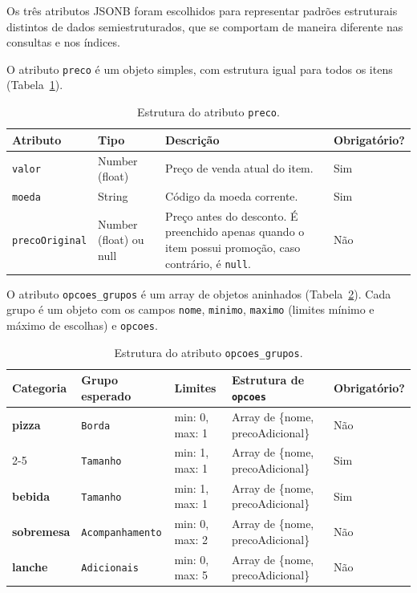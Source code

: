 Os três atributos JSONB foram escolhidos para representar padrões estruturais distintos de dados semiestruturados, 
que se comportam de maneira diferente nas consultas e nos índices.

O atributo \texttt{preco} é um objeto simples, com estrutura igual para todos os itens (Tabela~\ref{tab:jsonb-preco}). 

\begin{table}[H]
\centering
\renewcommand{\arraystretch}{1.1}
\caption{Estrutura do atributo \texttt{preco}.}
\label{tab:jsonb-preco}
\small
\begin{tabular}{|l|l|p{6cm}|l|}
\hline
\textbf{Atributo} & \textbf{Tipo} & \textbf{Descrição} & \textbf{Obrigatório?} \\ \hline
\texttt{valor} & Number (float) & Preço de venda atual do item. & Sim \\ \hline
\texttt{moeda} & String & Código da moeda corrente. & Sim \\ \hline
\texttt{precoOriginal} & Number (float) ou null & Preço antes do desconto. É preenchido apenas quando o item possui promoção, caso contrário, é \texttt{null}. & Não \\ \hline
\end{tabular}
\vspace{0.4em}
\end{table}

O atributo \texttt{opcoes\_grupos} é um array de objetos aninhados (Tabela~\ref{tab:jsonb-opcoes}). Cada grupo é um
objeto com os campos \texttt{nome}, \texttt{minimo}, \texttt{maximo} (limites mínimo e máximo de escolhas) e
\texttt{opcoes}. 

\begin{table}[H]
\centering
\renewcommand{\arraystretch}{1.1}
\caption{Estrutura do atributo \texttt{opcoes\_grupos}.}
\label{tab:jsonb-opcoes}
\small
\begin{tabular}{|l|l|l|p{4.2cm}|l|}
\hline
\textbf{Categoria} & \textbf{Grupo esperado} & \textbf{Limites} & \textbf{Estrutura de \texttt{opcoes}} & \textbf{Obrigatório?} \\ \hline
\textbf{pizza} & \texttt{Borda} & min: 0, max: 1 & Array de \{nome, precoAdicional\} & Não \\ \cline{2-5}
 & \texttt{Tamanho} & min: 1, max: 1 & Array de \{nome, precoAdicional\} & Sim \\ \hline
\textbf{bebida} & \texttt{Tamanho} & min: 1, max: 1 & Array de \{nome, precoAdicional\} & Sim \\ \hline
\textbf{sobremesa} & \texttt{Acompanhamento} & min: 0, max: 2 & Array de \{nome, precoAdicional\} & Não \\ \hline
\textbf{lanche} & \texttt{Adicionais} & min: 0, max: 5 & Array de \{nome, precoAdicional\} & Não \\ \hline
\end{tabular}
\vspace{0.4em}
\end{table}

